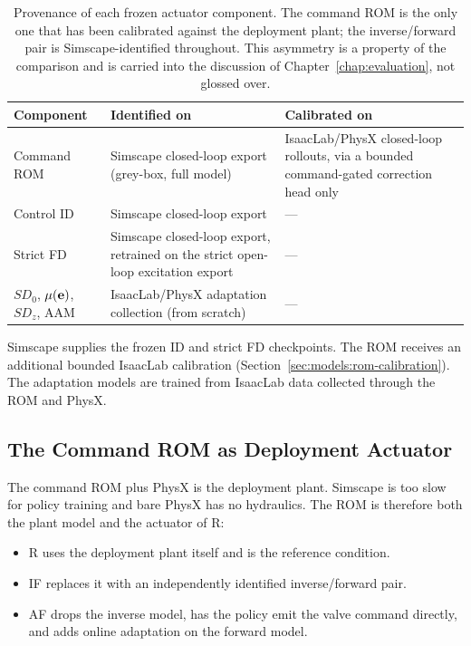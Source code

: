 \begin{table}[htbp]
  \centering
  \caption{Provenance of each frozen actuator component. The command ROM
  is the only one that has been calibrated against the deployment plant;
  the inverse/forward pair is Simscape-identified throughout. This
  asymmetry is a property of the comparison and is carried into the
  discussion of Chapter~\ref{chap:evaluation}, not glossed over.}
  \label{tab:sys:provenance}
  \small
  \begin{tabular}{lp{4.4cm}p{5.0cm}}
    \toprule
    Component & Identified on & Calibrated on \\
    \midrule
    Command ROM & Simscape closed-loop export (grey-box, full model)
      & IsaacLab/PhysX closed-loop rollouts, via a bounded command-gated
        correction head only \\
    Control ID & Simscape closed-loop export & --- \\
    Strict FD & Simscape closed-loop export, retrained on the strict
        open-loop excitation export & --- \\
    $SD_0$, $\mu(\mathbf{e})$, $SD_z$, AAM
      & IsaacLab/PhysX adaptation collection (from scratch) & --- \\
    \bottomrule
  \end{tabular}
\end{table}

Simscape supplies the frozen ID and strict FD checkpoints. The ROM receives an
additional bounded IsaacLab calibration
(Section~\ref{sec:models:rom-calibration}). The adaptation models are trained
from IsaacLab data collected through the ROM and PhysX.

\subsection{The Command ROM as Deployment Actuator}
\label{sec:sys:rom-is-plant}

The command ROM plus PhysX is the deployment plant. Simscape is too slow for
policy training and bare PhysX has no hydraulics. The ROM is therefore both the
plant model and the actuator of R:

\begin{itemize}
  \item R uses the deployment plant itself and is the reference condition.
  \item IF replaces it with an independently identified inverse/forward pair.
  \item AF drops the inverse model, has the policy emit the valve command
        directly, and adds online adaptation on the forward model.
\end{itemize}


